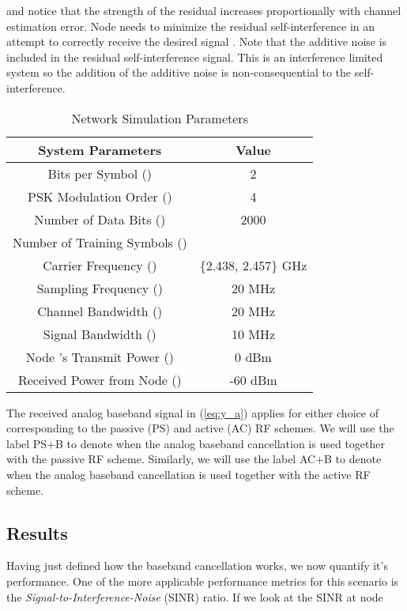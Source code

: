 \documentclass[12pt, journal,draftcls,letterpaper,onecolumn]{IEEEtran}
\begin{document}
and notice that the strength of the residual increases proportionally with channel estimation error.  Node  needs to minimize the residual self-interference in an attempt to correctly receive the desired signal .  Note that the additive noise is included in the residual self-interference signal.  This is an interference limited system so the addition of the additive noise is non-consequential to the self-interference.  
\begin{table}[h]
\begin{center}  
\caption{Network Simulation Parameters} 
\centering 
\begin{tabular}{|c||c|} 
\hline   
\textbf{System Parameters} & \textbf{Value} \\   
\hline\hline 
Bits per Symbol ()& 2\\
\hline
PSK Modulation Order ()& 4 \\
\hline
Number of Data Bits () & 2000\\ 
\hline
Number of Training Symbols ()& \\ 
\hline
Carrier Frequency ()& \{2.438, 2.457\} GHz  \\
\hline
Sampling Frequency ()& 20 MHz  \\
\hline
Channel Bandwidth ()& 20 MHz  \\
\hline
Signal Bandwidth ()& 10 MHz\\
\hline
Node 's Transmit Power ()& 0 dBm\\
\hline
Received Power from Node  ()& -60 dBm\\
\hline 
\end{tabular} 
\label{table:vars}  
\end{center}
\end{table} 

The received analog baseband signal in (\ref{eq:y_a}) applies for either choice of  corresponding to the passive (PS) and active (AC) RF schemes.  We will use the label PS+B to denote when the analog baseband cancellation is used together with the passive RF scheme.  Similarly, we will use the label AC+B to denote when the analog baseband cancellation is used together with the active RF scheme.  

\subsection{Results}
Having just defined how the baseband cancellation works, we now quantify it's performance.  One of the more applicable performance metrics for this scenario is the \emph{Signal-to-Interference-Noise} (SINR) ratio.  If we look at the SINR at node 
\end{document}
